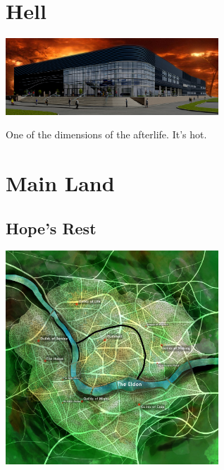 \section{Hell}

\begin{center}
\includegraphics[width=80mm]{./content/img/hellBuilding.jpg}
\begin{figure}[h]
\end{figure}
\end{center}

One of the dimensions of the afterlife. It's hot.

\section{Main Land}

\begin{center}
\end{center}


\subsection*{Hope's Rest} 

\vspace{5mm}

\begin{center}
\includegraphics[width=80mm]{./content/img/hopesRest.png}
\begin{figure}[h]
\end{figure}
\end{center}

